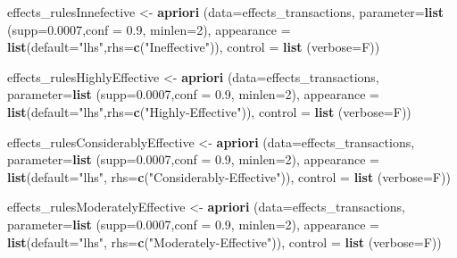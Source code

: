 \documentclass[spanish,]{article}
\newenvironment{Shaded}{\begin{snugshade}}{\end{snugshade}}
\newcommand{\KeywordTok}[1]{\textcolor[rgb]{0.13,0.29,0.53}{\textbf{#1}}}
\newcommand{\DataTypeTok}[1]{\textcolor[rgb]{0.13,0.29,0.53}{#1}}
\newcommand{\DecValTok}[1]{\textcolor[rgb]{0.00,0.00,0.81}{#1}}
\newcommand{\FloatTok}[1]{\textcolor[rgb]{0.00,0.00,0.81}{#1}}
\newcommand{\StringTok}[1]{\textcolor[rgb]{0.31,0.60,0.02}{#1}}
\newcommand{\NormalTok}[1]{#1}
\begin{document}
\begin{Shaded}
\begin{Highlighting}[]
\NormalTok{effects_rulesInnefective <-}\StringTok{ }\KeywordTok{apriori}\NormalTok{ (}\DataTypeTok{data=}\NormalTok{effects_transactions, }
                                 \DataTypeTok{parameter=}\KeywordTok{list}\NormalTok{ (}\DataTypeTok{supp=}\FloatTok{0.0007}\NormalTok{,}\DataTypeTok{conf =} \FloatTok{0.9}\NormalTok{, }\DataTypeTok{minlen=}\DecValTok{2}\NormalTok{), }
                                 \DataTypeTok{appearance =} \KeywordTok{list}\NormalTok{(}\DataTypeTok{default=}\StringTok{"lhs"}\NormalTok{,}\DataTypeTok{rhs=}\KeywordTok{c}\NormalTok{(}\StringTok{"Ineffective"}\NormalTok{)), }
                                 \DataTypeTok{control =} \KeywordTok{list}\NormalTok{ (}\DataTypeTok{verbose=}\NormalTok{F))}

\NormalTok{effects_rulesHighlyEffective <-}\StringTok{ }\KeywordTok{apriori}\NormalTok{ (}\DataTypeTok{data=}\NormalTok{effects_transactions, }
                             \DataTypeTok{parameter=}\KeywordTok{list}\NormalTok{ (}\DataTypeTok{supp=}\FloatTok{0.0007}\NormalTok{,}\DataTypeTok{conf =} \FloatTok{0.9}\NormalTok{, }\DataTypeTok{minlen=}\DecValTok{2}\NormalTok{), }
                             \DataTypeTok{appearance =} \KeywordTok{list}\NormalTok{(}\DataTypeTok{default=}\StringTok{"lhs"}\NormalTok{,}\DataTypeTok{rhs=}\KeywordTok{c}\NormalTok{(}\StringTok{"Highly-Effective"}\NormalTok{)), }
                             \DataTypeTok{control =} \KeywordTok{list}\NormalTok{ (}\DataTypeTok{verbose=}\NormalTok{F))}

\NormalTok{effects_rulesConsiderablyEffective <-}\StringTok{ }\KeywordTok{apriori}\NormalTok{ (}\DataTypeTok{data=}\NormalTok{effects_transactions, }
                                \DataTypeTok{parameter=}\KeywordTok{list}\NormalTok{ (}\DataTypeTok{supp=}\FloatTok{0.0007}\NormalTok{,}\DataTypeTok{conf =} \FloatTok{0.9}\NormalTok{, }\DataTypeTok{minlen=}\DecValTok{2}\NormalTok{), }
                                \DataTypeTok{appearance =} \KeywordTok{list}\NormalTok{(}\DataTypeTok{default=}\StringTok{"lhs"}\NormalTok{,}
                                                  \DataTypeTok{rhs=}\KeywordTok{c}\NormalTok{(}\StringTok{"Considerably-Effective"}\NormalTok{)), }
                                \DataTypeTok{control =} \KeywordTok{list}\NormalTok{ (}\DataTypeTok{verbose=}\NormalTok{F))}

\NormalTok{effects_rulesModeratelyEffective <-}\StringTok{ }\KeywordTok{apriori}\NormalTok{ (}\DataTypeTok{data=}\NormalTok{effects_transactions, }
                                \DataTypeTok{parameter=}\KeywordTok{list}\NormalTok{ (}\DataTypeTok{supp=}\FloatTok{0.0007}\NormalTok{,}\DataTypeTok{conf =} \FloatTok{0.9}\NormalTok{, }\DataTypeTok{minlen=}\DecValTok{2}\NormalTok{), }
                                \DataTypeTok{appearance =} \KeywordTok{list}\NormalTok{(}\DataTypeTok{default=}\StringTok{"lhs"}\NormalTok{,}
                                                  \DataTypeTok{rhs=}\KeywordTok{c}\NormalTok{(}\StringTok{"Moderately-Effective"}\NormalTok{)), }
                                \DataTypeTok{control =} \KeywordTok{list}\NormalTok{ (}\DataTypeTok{verbose=}\NormalTok{F))}


\end{Highlighting}
\end{Shaded}
\end{document}
